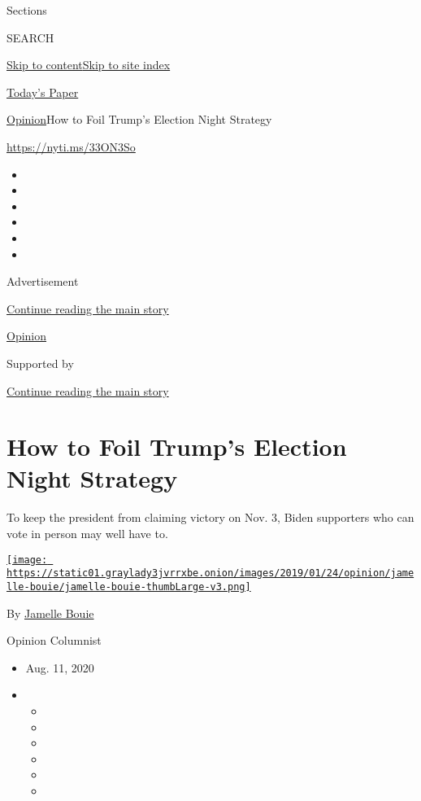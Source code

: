 Sections

SEARCH

\protect\hyperlink{site-content}{Skip to
content}\protect\hyperlink{site-index}{Skip to site index}

\href{https://myaccount.nytimes3xbfgragh.onion/auth/login?response_type=cookie\&client_id=vi}{}

\href{https://www.nytimes3xbfgragh.onion/section/todayspaper}{Today's
Paper}

\href{/section/opinion}{Opinion}\textbar{}How to Foil Trump's Election
Night Strategy

\url{https://nyti.ms/33ON3So}

\begin{itemize}
\item
\item
\item
\item
\item
\item
\end{itemize}

Advertisement

\protect\hyperlink{after-top}{Continue reading the main story}

\href{/section/opinion}{Opinion}

Supported by

\protect\hyperlink{after-sponsor}{Continue reading the main story}

\hypertarget{how-to-foil-trumps-election-night-strategy}{%
\section{How to Foil Trump's Election Night
Strategy}\label{how-to-foil-trumps-election-night-strategy}}

To keep the president from claiming victory on Nov. 3, Biden supporters
who can vote in person may well have to.

\href{https://www.nytimes3xbfgragh.onion/column/jamelle-bouie}{\texttt{[image: https://static01.graylady3jvrrxbe.onion/images/2019/01/24/opinion/jamelle-bouie/jamelle-bouie-thumbLarge-v3.png]}}

By
\href{https://www.nytimes3xbfgragh.onion/column/jamelle-bouie}{Jamelle
Bouie}

Opinion Columnist

\begin{itemize}
\item
  Aug. 11, 2020
\item
  \begin{itemize}
  \item
  \item
  \item
  \item
  \item
  \item
  \end{itemize}
\end{itemize}

